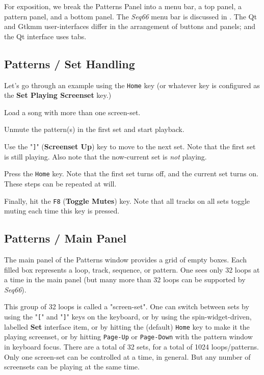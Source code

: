    For exposition, we break the Patterns Panel
   into a menu bar, a top panel, a pattern panel, and a bottom panel.
   The \textsl{Seq66} menu bar is discussed in
   .
   The Qt and Gtkmm user-interfaces differ in the arrangement of buttons and
   panels; and the Qt interface uses tabs.

\subsection{Patterns / Set Handling}
\label{subsec:patterns_panel_set_handling}


   Let's go through an example using the \texttt{Home} key (or whatever key is
   configured as the \textbf{Set Playing Screenset} key.)

   \begin{enumber}
      \item Load a song with more than one screen-set.
      \item Unmute the pattern(s) in the first set and start playback.
      \item Use the "\texttt{]}" (\textbf{Screenset Up}) key to move to the next
         set.  Note that the first set is still playing.  Also note that the
         now-current set is \textsl{not} playing.
      \item Press the \texttt{Home} key.
         Note that the first set turns off, and the current set turns on.
         These steps can be repeated at will.
      \item Finally, hit the \texttt{F8} (\textbf{Toggle Mutes}) key.
         Note that all tracks on all sets toggle muting each time this key is
         pressed.
   \end{enumber}

\subsection{Patterns / Main Panel}
\label{subsec:patterns_panel_main}

   The main panel of the Patterns window provides a grid of empty boxes.
   Each filled box represents a loop, track, sequence, or pattern.
   One sees only 32 loops at a time in the main panel (but many more than
   32 loops can be supported by \textsl{Seq66}).

   This group of 32 loops is called a "screen-set".
   One can switch between sets by using the
   \index{keys![}
   "\texttt{[}" and
   \index{keys!]}
   "\texttt{]}" keys on the keyboard, or by using
   the spin-widget-driven, labelled \textbf{Set} interface item, or
   by hitting the (default) \texttt{Home} key to make it the playing screenset,
   or by hitting \texttt{Page-Up} or \texttt{Page-Down} with the pattern window
   in keyboard focus.
   There are a total of 32 sets, for a total of 1024 loops/patterns. 
   Only one screen-set can be controlled at a time, in general.
   But any number of screensets can be playing at the same time.

